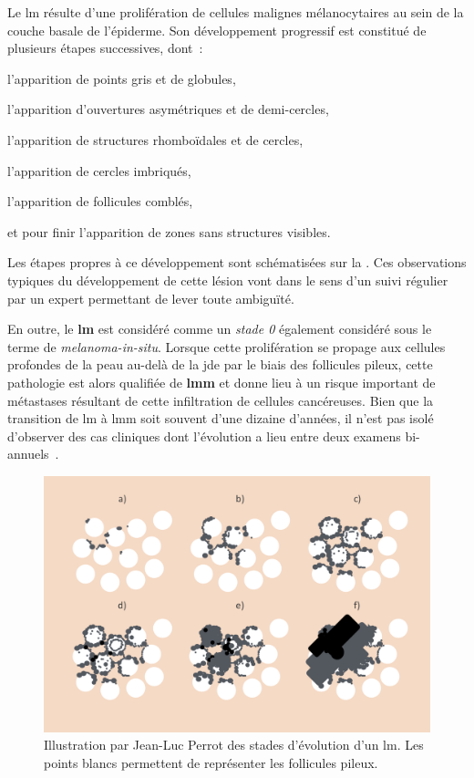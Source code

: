 Le \gls{lm} résulte d'une prolifération de cellules malignes mélanocytaires au sein de la couche basale de l'épiderme. Son développement progressif est constitué de plusieurs étapes successives, dont~:
\begin{inlinerate}[label=(\alph*)]
    \item l'apparition de points gris et de globules,
    \item l'apparition d'ouvertures asymétriques et de demi-cercles,
    \item l'apparition de structures rhomboïdales et de cercles,
    \item l'apparition de cercles imbriqués,
    \item l'apparition de follicules comblés,
    \item et pour finir l'apparition de zones sans structures visibles.
\end{inlinerate} 
Les étapes propres à ce développement sont schématisées sur la . Ces observations typiques du développement de cette lésion vont dans le sens d'un suivi régulier par un expert permettant de lever toute ambiguïté.\par

En outre, le \textbf{\gls{lm}} est considéré comme un \textit{stade 0} également considéré sous le terme de \textit{melanoma-in-situ}. Lorsque cette prolifération se propage aux cellules profondes de la peau au-delà de la \gls{jde} par le biais des follicules pileux, cette pathologie est alors qualifiée de \textbf{\gls{lmm}} et donne lieu à un risque important de métastases résultant de cette infiltration de cellules cancéreuses. Bien que la transition de \gls{lm} à \gls{lmm} soit souvent d'une dizaine d'années, il n'est pas isolé d'observer des cas cliniques dont l'évolution a lieu entre deux examens bi-annuels~\cite{Mckenna2006, LeGal2011}. 

\begin{figure}[H]
    \centering
    \includegraphics[width=\linewidth]{contents/chapter_1/resources/illustration_surface_progression.pdf}
    \caption{Illustration par Jean-Luc Perrot des stades d'évolution d'un \gls{lm}. Les points blancs permettent de représenter les follicules pileux.}
    \label{fig:illustration_surface_progression}
\end{figure}\par

